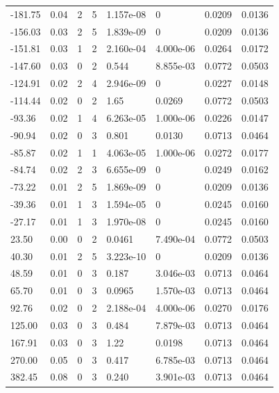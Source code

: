 \documentclass[preview]{standalone}
\begin{document}
{{\begin{tabular}{L{1.2cm}C{1.2cm} C{0.3cm}C{0.5cm} C{1.4cm}C{1.4cm} C{1.4cm}C{1.4cm}}
  -181.75  &  0.04  & 2     &  5 &  1.157e-08  & 0  & 0.0209 &  0.0136   \\ 
  -156.03  &  0.03  & 2     &  5 &  1.839e-09  & 0  & 0.0209 &  0.0136   \\ 
  -151.81  &  0.03  & 1     &  2 &  2.160e-04  & 4.000e-06  & 0.0264 &  0.0172   \\ 
  -147.60  &  0.03  & 0     &  2 &  0.544  & 8.855e-03  & 0.0772 &  0.0503   \\ 
  -124.91  &  0.02  & 2     &  4 &  2.946e-09  & 0  & 0.0227 &  0.0148   \\ 
  -114.44  &  0.02  & 0     &  2 &  1.65  & 0.0269  & 0.0772 &  0.0503   \\ 
  -93.36  &  0.02  & 1     &  4 &  6.263e-05  & 1.000e-06  & 0.0226 &  0.0147   \\ 
  -90.94  &  0.02  & 0     &  3 &  0.801  & 0.0130  & 0.0713 &  0.0464   \\ 
  -85.87  &  0.02  & 1     &  1 &  4.063e-05  & 1.000e-06  & 0.0272 &  0.0177   \\ 
  -84.74  &  0.02  & 2     &  3 &  6.655e-09  & 0  & 0.0249 &  0.0162   \\ 
  -73.22  &  0.01  & 2     &  5 &  1.869e-09  & 0  & 0.0209 &  0.0136   \\ 
  -39.36  &  0.01  & 1     &  3 &  1.594e-05  & 0  & 0.0245 &  0.0160   \\ 
  -27.17  &  0.01  & 1     &  3 &  1.970e-08  & 0  & 0.0245 &  0.0160   \\ 
  23.50  &  0.00  & 0     &  2 &  0.0461  & 7.490e-04  & 0.0772 &  0.0503   \\ 
  40.30  &  0.01  & 2     &  5 &  3.223e-10  & 0  & 0.0209 &  0.0136   \\ 
  48.59  &  0.01  & 0     &  3 &  0.187  & 3.046e-03  & 0.0713 &  0.0464   \\ 
  65.70  &  0.01  & 0     &  3 &  0.0965  & 1.570e-03  & 0.0713 &  0.0464   \\ 
  92.76  &  0.02  & 0     &  2 &  2.188e-04  & 4.000e-06  & 0.0270 &  0.0176   \\ 
  125.00  &  0.03  & 0     &  3 &  0.484  & 7.879e-03  & 0.0713 &  0.0464   \\ 
  167.91  &  0.03  & 0     &  3 &  1.22  & 0.0198  & 0.0713 &  0.0464   \\ 
  270.00  &  0.05  & 0     &  3 &  0.417  & 6.785e-03  & 0.0713 &  0.0464   \\ 
  382.45  &  0.08  & 0     &  3 &  0.240  & 3.901e-03  & 0.0713 &  0.0464   \\ 

\end{tabular}}}
\end{document}
